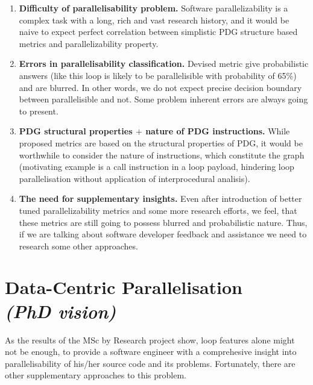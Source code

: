 \documentclass[12pt, a4paper]{article}
\begin{document}
\begin{enumerate}[align=left,leftmargin=*]
\item \textbf{Difficulty of parallelisability problem.} Software parallelizability is a complex task with a long, rich and vast research history, and it would be naive to expect perfect correlation between simplistic PDG structure based metrics and parallelizability property. 
\item \textbf{Errors in parallelisability classification.} Devised metric give probabilistic answers (like this loop is likely to be parallelisible with probability of 65\%) and are blurred. In other words, we do not expect precise decision boundary between parallelisible and not. Some problem inherent errors are always going to present.
\item \textbf{PDG structural properties $+$ nature of PDG instructions.} While proposed metrics are based on the structural properties of PDG, it would be worthwhile to consider the nature of instructions, which constitute the graph (motivating example is a call instruction in a loop payload, hindering loop parallelisation without application of interprocedural analisis).
\item \textbf{The need for supplementary insights.} Even after introduction of better tuned parallelizability metrics and some more research efforts, we feel, that these metrics are still going to possess blurred and probabilistic nature. Thus, if we are talking about software developer feedback and assistance we need to research some other approaches.
\end{enumerate}

\section*{\centering Data-Centric Parallelisation\\
	{\footnotesize \textit{(PhD vision)}}}
\qquad As the results of the MSc by Research project show, loop features alone might not be enough, to provide a software engineer with a comprehesive insight into parallelisability of his/her source code and its problems. Fortunately, there are other supplementary approaches to this problem.
\end{document}
